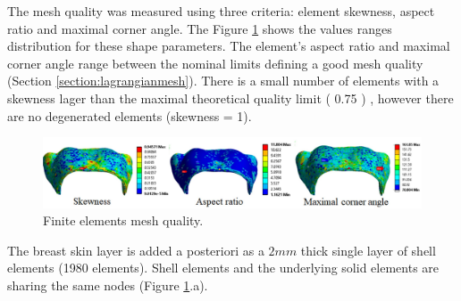  The mesh quality was measured using three criteria: element skewness, aspect ratio and maximal corner angle. The Figure \ref{fig:meshquality} shows the values ranges distribution for these shape parameters. The element's aspect ratio and maximal corner angle range between the nominal limits defining a good mesh quality (Section \ref{section:lagrangianmesh}). There is a small number of elements with a skewness lager than the maximal theoretical quality limit ( 0.75 ) , however there are no degenerated elements (skewness = 1).  

\begin{figure}[!h]
\centering
\includegraphics[width=1\textwidth,keepaspectratio]{figures/meshquality.jpg} 
\caption{ Finite elements mesh quality.}\label{fig:meshquality}
\end{figure}




The breast skin layer is added a posteriori   as a $2mm$ thick single layer of shell elements (1980 elements). Shell elements and the underlying solid elements are sharing the same nodes (Figure \ref{fig:meshquality}.a).



